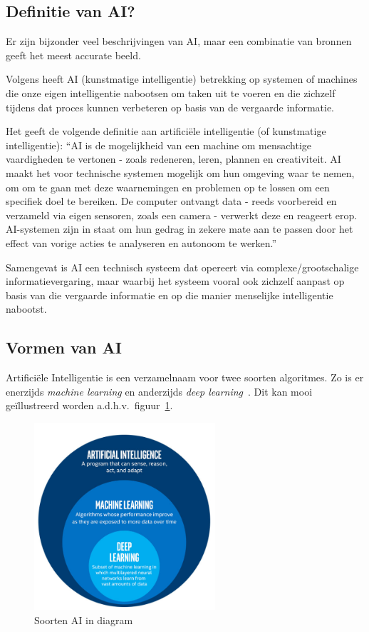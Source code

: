 \subsection{Definitie van AI?}
Er zijn bijzonder veel beschrijvingen van AI, maar een combinatie van bronnen geeft het meest accurate beeld.

Volgens \textcite{Oracle2014} heeft AI (kunstmatige intelligentie) betrekking op systemen of machines die onze eigen intelligentie nabootsen om taken uit te voeren en die zichzelf tijdens dat proces kunnen verbeteren op basis van de vergaarde informatie.

Het \textcite{EuropeesParlement2020} geeft de volgende definitie aan artificiële intelligentie (of kunstmatige intelligentie): ``AI is de mogelijkheid van een machine om mensachtige vaardigheden te vertonen - zoals redeneren, leren, plannen en creativiteit.
AI maakt het voor technische systemen mogelijk om hun omgeving waar te nemen, om om te gaan met deze waarnemingen en problemen op te lossen om een specifiek doel te bereiken. De computer ontvangt data - reeds voorbereid en verzameld via eigen sensoren, zoals een camera - verwerkt deze en reageert erop.
AI-systemen zijn in staat om hun gedrag in zekere mate aan te passen door het effect van vorige acties te analyseren en autonoom te werken.''

Samengevat is AI een technisch systeem dat opereert via complexe/grootschalige informatievergaring, maar waarbij het systeem vooral ook zichzelf aanpast op basis van die vergaarde informatie en op die manier menselijke intelligentie nabootst.

\subsection{Vormen van AI}
Artificiële Intelligentie is een verzamelnaam voor twee soorten algoritmes. Zo is er enerzijds \textit{machine learning} en anderzijds \textit{deep learning}~\autocite{Kavlakoglu2020}.
Dit kan mooi geïllustreerd worden a.d.h.v.\ figuur~\ref{fig:soorten_ai_diagram}.

\begin{figure}
    \centering
    \includegraphics[width=0.6\textwidth]{./img/ai_fields}
    \caption{\label{fig:soorten_ai_diagram} Soorten AI in diagram~\autocite{Bansal2019}}
\end{figure}

